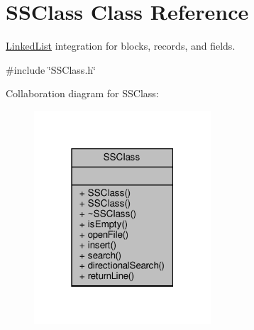 \hypertarget{classSSClass}{}\section{S\+S\+Class Class Reference}
\label{classSSClass}


\hyperlink{classLinkedList}{Linked\+List} integration for blocks, records, and fields.  




{\ttfamily \#include \char`\"{}S\+S\+Class.\+h\char`\"{}}



Collaboration diagram for S\+S\+Class\+:\nopagebreak
\begin{figure}[H]
\begin{center}
\leavevmode
\includegraphics[width=187pt]{classSSClass__coll__graph}
\end{center}
\end{figure}
